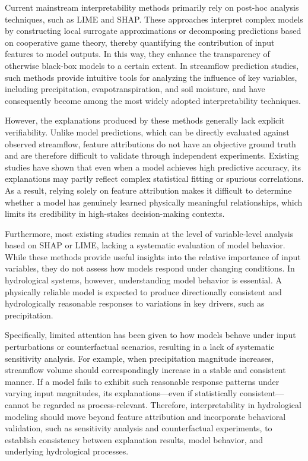 Current mainstream interpretability methods primarily rely on post-hoc analysis techniques, such as LIME\cite{Ribeiro2016_LIME_Origin} and SHAP\cite{lundberg2017_Shap_Origin}. These approaches interpret complex models by constructing local surrogate approximations or decomposing predictions based on cooperative game theory\cite{Clark2025_Shap}, thereby quantifying the contribution of input features to model outputs. In this way, they enhance the transparency of otherwise black-box models to a certain extent\cite{Wagan2026_LIME}. In streamflow prediction studies, such methods provide intuitive tools for analyzing the influence of key variables, including precipitation, evapotranspiration, and soil moisture, and have consequently become among the most widely adopted interpretability techniques.

However, the explanations produced by these methods generally lack explicit verifiability\cite{NEURIPS2021_shap_residuals}. Unlike model predictions, which can be directly evaluated against observed streamflow, feature attributions do not have an objective ground truth and are therefore difficult to validate through independent experiments\cite{TAKEFUJI2026_Shap_problem}. Existing studies have shown that even when a model achieves high predictive accuracy, its explanations may partly reflect complex statistical fitting or spurious correlations\cite{e24050687_Shap_problem}. As a result, relying solely on feature attribution makes it difficult to determine whether a model has genuinely learned physically meaningful relationships\cite{Benchmarkingofa_PhysicallyBasedHydrologicModel}, which limits its credibility in high-stakes decision-making contexts.

Furthermore, most existing studies remain at the level of variable-level analysis based on SHAP or LIME\cite{ZHOU2026103254,XIA2026103232}, lacking a systematic evaluation of model behavior. While these methods provide useful insights into the relative importance of input variables, they do not assess how models respond under changing conditions\cite{10.2166/wcc.2017.149}. In hydrological systems, however, understanding model behavior is essential. A physically reliable model is expected to produce directionally consistent and hydrologically reasonable responses\cite{hess-30-1077-2026} to variations in key drivers, such as precipitation.

Specifically, limited attention has been given to how models behave under input perturbations or counterfactual scenarios, resulting in a lack of systematic sensitivity analysis\cite{simic2025perturbation}. For example, when precipitation magnitude increases, streamflow volume should correspondingly increase in a stable and consistent manner\cite{nearing2021role}. If a model fails to exhibit such reasonable response patterns under varying input magnitudes, its explanations—even if statistically consistent—cannot be regarded as process-relevant. Therefore, interpretability in hydrological modeling should move beyond feature attribution and incorporate behavioral validation, such as sensitivity analysis and counterfactual experiments\cite{ZHANG2025123192}, to establish consistency between explanation results, model behavior, and underlying hydrological processes\cite{read2019process}.


